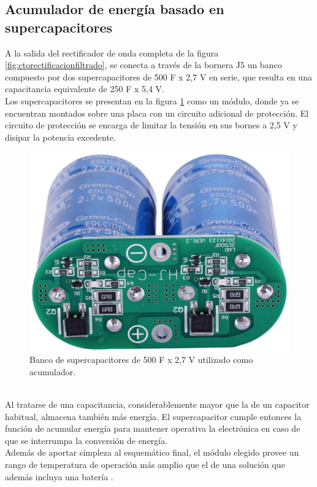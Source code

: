 \subsection{Acumulador de energía basado en supercapacitores}
A la salida del rectificador de onda completa de la figura \ref{fig:ctorectificacionfiltrado}, se conecta a través de la bornera J5 un banco compuesto por dos supercapacitores de 500 F x 2,7 V en serie, que resulta en una capacitancia equivalente de 250 F x 5,4 V.\\
Los supercapacitores se presentan en la figura \ref{fig:imagensupercap} como un módulo, donde ya se encuentran montados sobre una placa con un circuito adicional de protección. El circuito de protección se encarga de limitar la tensión en sus bornes a 2,5 V y disipar la potencia excedente.\\
\begin{figure}[h]
	\centering
	\includegraphics[width=0.5\linewidth]{Figures/imagen_supercap}
	\caption{Banco de supercapacitores de 500 F x 2,7 V utilizado como acumulador.}
	\label{fig:imagensupercap}
\end{figure}\\
Al tratarse de una capacitancia, considerablemente mayor que la de un capacitor habitual, almacena también más energía. El supercapacitor cumple entonces la función de acumular energía para mantener operativa la electrónica en caso de que se interrumpa la conversión de energía.\\
Además de aportar simpleza al esquemático final, el módulo elegido provee un rango de temperatura de operación más amplio que el de una solución que además incluya una batería \citep{PORCARELLI20141671}.

